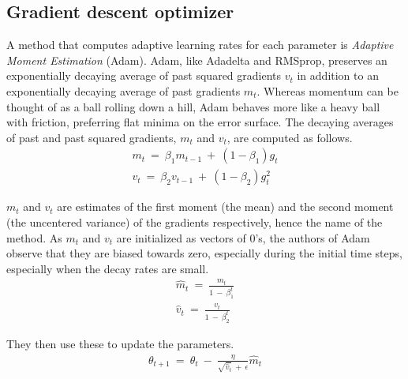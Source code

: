 \subsection{Gradient descent optimizer}
\label{gradient_optimizer}
\hspace{0.5cm}A method that computes adaptive learning rates for each parameter is \textit{Adaptive Moment Estimation} (Adam). Adam, like Adadelta and RMSprop, preserves an exponentially decaying average of past squared gradients $v_t$ in addition to an exponentially decaying average of past gradients $m_t$. Whereas momentum can be thought of as a ball rolling down a hill, Adam behaves more like a heavy ball with friction, preferring flat minima on the error surface. The decaying averages of past and past squared gradients, $m_t$ and $v_t$, are computed as follows.
\begin{align*}
    m_t \: = \: \beta_1 m_{t-1} \: + \: (1-\beta_1)g_{t}\\
    v_t \: = \: \beta_2 v_{t-1} \: + \: (1-\beta_2)g^2_t
\end{align*}


$m_t$ and $v_t$ are estimates of the first moment (the mean) and the second moment (the uncentered variance) of the gradients respectively, hence the name of the method. As $m_t$ and $v_t$ are initialized as vectors of 0's, the authors of Adam observe that they are biased towards zero, especially during the initial time steps, especially when the decay rates are small.
\begin{align*}
    \hat{m}_t \: = \: \frac{m_t}{1\:-\:\beta^t_1} \\
 \hat{v}_t \: = \: \frac{v_t}{1\: - \: \beta^t_2}
\end{align*}



They then use these to update the parameters.
\begin{align*}
\theta_{t+1} \: = \: \theta_t \: - \: \frac{\eta}{\sqrt{\hat{v}_t} \: +\: \epsilon} \hat{m}_t
\end{align*}
